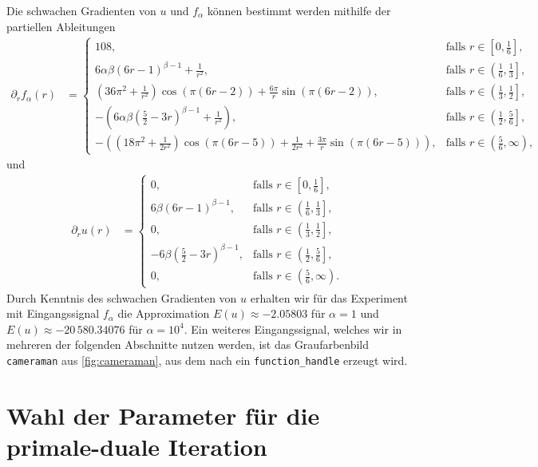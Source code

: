Die schwachen Gradienten von $u$ und $f_\alpha$ können bestimmt werden mithilfe
der partiellen Ableitungen
\begin{align*}
  \partial_r f_\alpha(r)
  &=
  \begin{cases}
    108,
    & \text{falls } r\in\left[0,\frac{1}{6}\right]\!,\\
    6\alpha\beta(6r-1)^{\beta-1} +\frac{1}{r^2}, 
    & \text{falls } r\in\left(\frac{1}{6},\frac{1}{3}\right]\!,\\
    \left(36\pi^2+\frac{1}{r^2}\right)\cos(\pi(6r-2))
    + \frac{6\pi}{r}\sin(\pi(6r-2)), 
    & \text{falls } r\in\left(\frac{1}{3},\frac{1}{2}\right]\!,\\
    -\left(6\alpha\beta\left( \frac{5}{2}-3r \right)^{\beta-1}+
    \frac{1}{r^2}\right),
    & \text{falls } r\in\left(\frac{1}{2},\frac{5}{6}\right]\!,\\
    -\left( \left( 18\pi^2+\frac{1}{2r^2} \right)\cos(\pi(6r-5))
    +\frac{1}{2r^2} + \frac{3\pi}{r}\sin(\pi(6r-5))\right)\!, 
    &\text{falls } r\in\left(\frac{5}{6},\infty\right)\!,
  \end{cases}
\end{align*}
und 
\begin{align*}
  \partial_r u(r) 
  &= 
  \begin{cases}
    0,
    & \text{falls } r\in\left[0,\frac{1}{6}\right]\!,\\
    6\beta(6r-1)^{\beta-1}, 
    & \text{falls } r\in\left(\frac{1}{6},\frac{1}{3}\right]\!,\\
    0, 
    & \text{falls } r\in\left(\frac{1}{3},\frac{1}{2}\right]\!,\\
    -6\beta\left( \frac{5}{2}-3r \right)^{\beta-1},
    & \text{falls } r\in\left(\frac{1}{2},\frac{5}{6}\right]\!,\\
    0,
    &\text{falls } r\in\left(\frac{5}{6},\infty\right)\!.
  \end{cases}
\end{align*} 
Durch Kenntnis des schwachen Gradienten von $u$ erhalten wir für das Experiment
mit Eingangssignal $f_\alpha$ die Approximation $E(u)\approx -2.05803$ für
$\alpha=1$ und $E(u)\approx -20\,580.34076$ für $\alpha=10^4$.
Ein weiteres Eingangssignal, welches wir in mehreren der folgenden Abschnitte
nutzen werden, ist das Graufarbenbild \texttt{cameraman} aus
\cref{fig:cameraman}, aus dem nach  ein
\texttt{function\_handle} erzeugt wird.


\section{Wahl der Parameter für die primale-duale Iteration}
\label{sec:choiceOfParameters}


